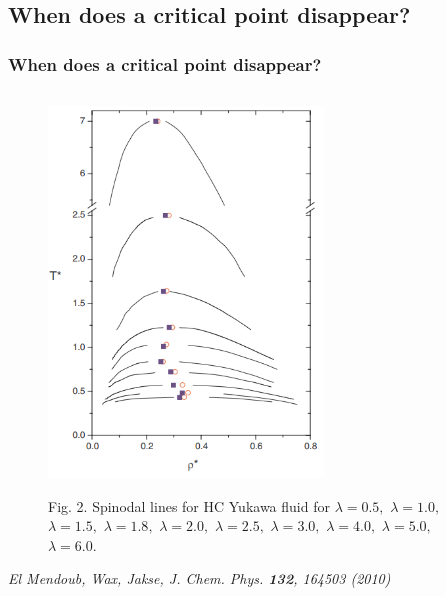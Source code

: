 \documentclass[8pt]{beamer}
\begin{document}
	\subsection{When does a critical point disappear?}
	
	\begin{frame}
		\frametitle{When does a critical point disappear?}
		
		\begin{columns}
			\begin{column}{0.5\textwidth}
				\begin{figure}[htbp]
					\includegraphics[width=0.65\textwidth,angle=0]{limit_cp_spinodals} \\
					\parbox{1.0\textwidth}{\caption*{Fig. 2. Spinodal lines for HC Yukawa fluid for $\lambda = 0.5,$ $\lambda = 1.0,$ $\lambda = 1.5,$ $\lambda = 1.8,$ $\lambda = 2.0,$ $\lambda = 2.5,$ $\lambda = 3.0,$ $\lambda = 4.0,$ $\lambda = 5.0,$ $\lambda = 6.0$.
					}}
				\end{figure}
				
				\textit{El Mendoub, Wax, Jakse, J. Chem. Phys. \textbf{132}, 164503 (2010)}
			\end{column}
			

\end{columns}
\end{frame}
\end{document}

